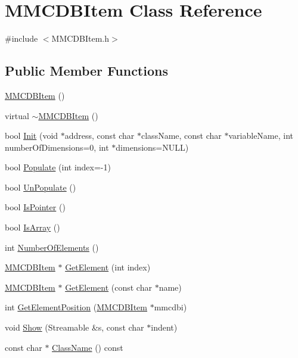 \hypertarget{classMMCDBItem}{
\section{MMCDBItem Class Reference}
\label{classMMCDBItem}
}


{\ttfamily \#include $<$MMCDBItem.h$>$}

\subsection*{Public Member Functions}
\begin{DoxyCompactItemize}
\item 
\hyperlink{classMMCDBItem_a5f21296ebd80095d96c390aad01f5b7e}{MMCDBItem} ()
\item 
virtual \hyperlink{classMMCDBItem_aec530e395b9a972b206b807045ff051b}{$\sim$MMCDBItem} ()
\item 
bool \hyperlink{classMMCDBItem_a92e272cb66d8ab4509892326311a8262}{Init} (void $\ast$address, const char $\ast$className, const char $\ast$variableName, int numberOfDimensions=0, int $\ast$dimensions=NULL)
\item 
bool \hyperlink{classMMCDBItem_a31ad65be84e9d192532773231eb36fc5}{Populate} (int index=-\/1)
\item 
bool \hyperlink{classMMCDBItem_a6f45b1839b2b805c1328c787acc2cef3}{UnPopulate} ()
\item 
bool \hyperlink{classMMCDBItem_a18f846f8b9a456dab99d401cc2fd9bc9}{IsPointer} ()
\item 
bool \hyperlink{classMMCDBItem_a61c6d4bddc781d3345e136741cf68e2c}{IsArray} ()
\item 
int \hyperlink{classMMCDBItem_a56c0686b4bb5deb388213c0da61fb14b}{NumberOfElements} ()
\item 
\hyperlink{classMMCDBItem}{MMCDBItem} $\ast$ \hyperlink{classMMCDBItem_a2ac885747c9810eb0ef55e8912156c87}{GetElement} (int index)
\item 
\hyperlink{classMMCDBItem}{MMCDBItem} $\ast$ \hyperlink{classMMCDBItem_a81e24c00a86b8f42c9f009f516c53738}{GetElement} (const char $\ast$name)
\item 
int \hyperlink{classMMCDBItem_a6910fb0f2f7287e514975174d9cc9c0e}{GetElementPosition} (\hyperlink{classMMCDBItem}{MMCDBItem} $\ast$mmcdbi)
\item 
void \hyperlink{classMMCDBItem_a2fe0e3359d9652946fb1e395f0536d1e}{Show} (Streamable \&s, const char $\ast$indent)
\item 
const char $\ast$ \hyperlink{classMMCDBItem_ae43063e2a6556e6f4b6c858ec764f7c0}{ClassName} () const 

\end{DoxyCompactItemize}
